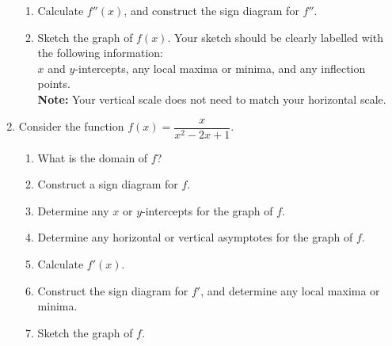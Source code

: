 \documentclass[12pt]{article}
\newcommand{\points}[1]{\marginpar{\hspace{24pt}[#1]}}
\begin{document}
\begin{enumerate}
\begin{enumerate}
\item Calculate $f''(x)$, and construct the sign diagram for $f''$. \points{2}

\vspace{2in}

 \item Sketch the graph of $f(x)$. Your sketch should be clearly labelled with the following information:\\
 $x$ and $y$-intercepts, any local maxima or minima, and any inflection points.\points{5}\\
{\bf Note:} Your vertical scale does not need to match your horizontal scale.
\end{enumerate}
\newpage

\item Consider the function $f(x) = \dfrac{x}{x^2-2x+1}$.
\begin{enumerate}
 \item What is the domain of $f$? \points{1}
\vspace{2in} 

 \item Construct a sign diagram for $f$. \points{1}

\vspace{2in}

 \item Determine any $x$ or $y$-intercepts for the graph of $f$. \points{1}

\vspace{1.5in}

 \item Determine any horizontal or vertical asymptotes for the graph of $f$. \points{2}

\newpage

 \item Calculate $f'(x)$. \points{3}

\vspace{2in}

 \item Construct the sign diagram for $f'$, and determine any local maxima or minima.\points{2}

\vspace{2in}


 \item Sketch the graph of $f$. \points{5}
\end{enumerate}




\end{enumerate}
\newpage
\end{document}
